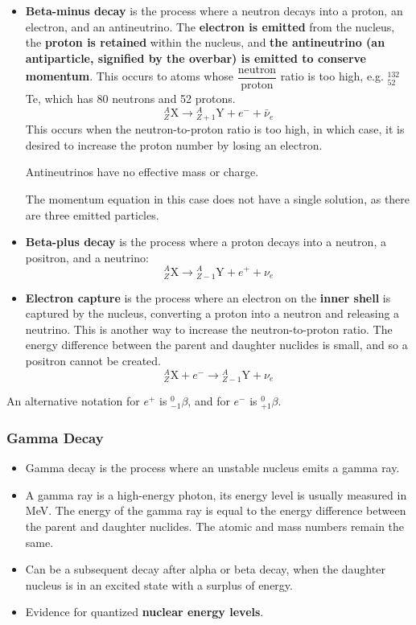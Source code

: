 \documentclass[a4paper,12pt]{article}
\newcommand{\atom}[3]{{}^{#1}_{#2}\text{#3}}
\begin{document}
\begin{itemize}
  \item \textbf{Beta-minus decay} is the process where a neutron decays into a proton, an electron, and an antineutrino. The \textbf{electron is emitted} from the nucleus, the \textbf{proton is retained} within the nucleus, and \textbf{the antineutrino (an antiparticle, signified by the overbar) is emitted to conserve momentum}. This occurs to atoms whose $\dfrac{\text{neutron}}{\text{proton}}$ ratio is too high, e.g. $^{132}_{52}$Te, which has 80 neutrons and 52 protons.
        \[
          \atom{A}{Z}{X} \rightarrow \atom{A}{Z+1}{Y} + e^- + \bar{\nu}_e
        \]
        This occurs when the neutron-to-proton ratio is too high, in which case, it is desired to increase the proton number by losing an electron.

        Antineutrinos have no effective mass or charge.

        The momentum equation in this case does not have a single solution, as there are three emitted particles.
  \item \textbf{Beta-plus decay} is the process where a proton decays into a neutron, a positron, and a neutrino:
        \[
          \atom{A}{Z}{X} \rightarrow \atom{A}{Z-1}{Y} + e^+ + \nu_e
        \]
  \item \textbf{Electron capture} is the process where an electron on the \textbf{inner shell} is captured by the nucleus, converting a proton into a neutron and releasing a neutrino. This is another way to increase the neutron-to-proton ratio. The energy difference between the parent and daughter nuclides is small, and so a positron cannot be created.
        \[
          \atom{A}{Z}{X} + e^- \rightarrow \atom{A}{Z-1}{Y} + \nu_e
        \]
\end{itemize}

An alternative notation for $e^+$ is $\atom{0}{-1}{$\beta$}$, and for $e^-$ is $\atom{0}{+1}{$\beta$}$.

\pagebreak

\subsubsection{Gamma Decay}

\begin{itemize}
  \item Gamma decay is the process where an unstable nucleus emits a gamma ray.
  \item A gamma ray is a high-energy photon, its energy level is usually measured in MeV. The energy of the gamma ray is equal to the energy difference between the parent and daughter nuclides. The atomic and mass numbers remain the same.
  \item Can be a subsequent decay after alpha or beta decay, when the daughter nucleus is in an excited state with a surplus of energy.
  \item Evidence for quantized \textbf{nuclear energy levels}.
\end{itemize}
\end{document}
